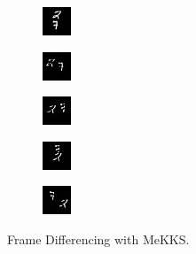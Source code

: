     \begin{subfigure}[t]{0.9\textwidth}
        \centering
        \begin{subfigure}[t]{0.19\textwidth}
            \centering
            \includegraphics[scale=2]{figures/MeKKS-DIFFERENCING/frame0}
        \end{subfigure}
        \hfill
        \begin{subfigure}[t]{0.19\textwidth}
            \centering
            \includegraphics[scale=2]{figures/MeKKS-DIFFERENCING/frame4}
        \end{subfigure}
        \hfill
        \begin{subfigure}[t]{0.19\textwidth}
            \centering
            \includegraphics[scale=2]{figures/MeKKS-DIFFERENCING/frame8}
        \end{subfigure}
        \hfill
        \begin{subfigure}[t]{0.19\textwidth}
            \centering
            \includegraphics[scale=2]{figures/MeKKS-DIFFERENCING/frame12}
        \end{subfigure}
        \hfill
        \begin{subfigure}[t]{0.19\textwidth}
            \centering
            \includegraphics[scale=2]{figures/MeKKS-DIFFERENCING/frame16}
        \end{subfigure}
        \caption{Frame Differencing with MeKKS.}
    \end{subfigure}
    \\ \bigskip
